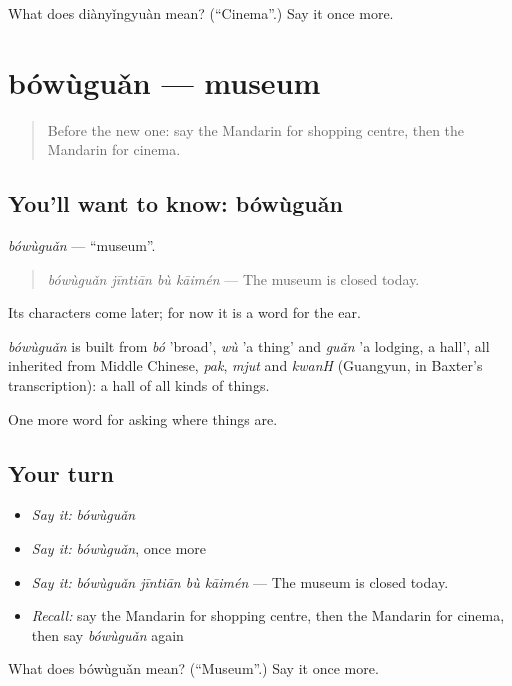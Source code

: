 \begin{tcolorbox}[breakable,colback=teal!4,colframe=teal!35!black,title={Before you move on}]
What does diànyǐngyuàn mean? (\textquotedblleft{}Cinema\textquotedblright{}.) Say it once more.
\end{tcolorbox}
\section[bówùguǎn]{bówùguǎn — museum}

\label{lesson:ZH-C190-bowuguan}



\begin{quote}
Before the new one: say the Mandarin for shopping centre, then the Mandarin for cinema.
\end{quote}

\subsection*{You'll want to know: bówùguǎn}
\emph{bówùguǎn} — \textquotedblleft{}museum\textquotedblright{}.

\begin{quote}
\emph{bówùguǎn jīntiān bù kāimén} — The museum is closed today.
\end{quote}

Its characters come later; for now it is a word for the ear.

\begin{cousinweb}
\emph{bówùguǎn} is built from \emph{bó} 'broad', \emph{wù} 'a thing' and \emph{guǎn} 'a lodging, a hall', all inherited from Middle Chinese, \emph{pak}, \emph{mjut} and \emph{kwanH} (Guangyun, in Baxter's transcription): a hall of all kinds of things.
\end{cousinweb}

\begin{grammarlens}[title={What you've built}]
One more word for asking where things are.
\end{grammarlens}

\subsection*{Your turn}
\begin{itemize}
\raggedright
  \item \emph{Say it:} \emph{bówùguǎn}
  \item \emph{Say it:} \emph{bówùguǎn}, once more
  \item \emph{Say it:} \emph{bówùguǎn jīntiān bù kāimén} — The museum is closed today.
  \item \emph{Recall:} say the Mandarin for shopping centre, then the Mandarin for cinema, then say \emph{bówùguǎn} again
\end{itemize}

\begin{tcolorbox}[breakable,colback=teal!4,colframe=teal!35!black,title={Before you move on}]
What does bówùguǎn mean? (\textquotedblleft{}Museum\textquotedblright{}.) Say it once more.
\end{tcolorbox}
